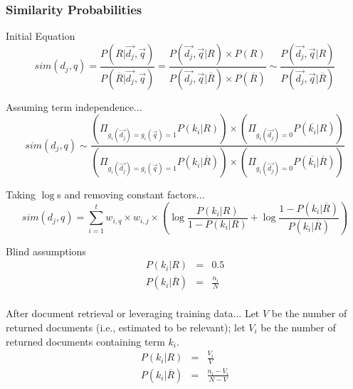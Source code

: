 \documentclass[svgnames]{beamer}
\begin{document}
\begin{frame}[allowframebreaks]
  \frametitle{Similarity Probabilities}

  \begin{block}{Initial Equation}
    \small
    \begin{displaymath}
        sim(d_j,q) = \frac{P(R|\vec{d_j},\vec{q})}{P(\overline{R}|\vec{d_j},\vec{q})}
        = \frac{P(\vec{d_j},\vec{q}|R) \times P(R)}{P(\vec{d_j},\vec{q}|\overline{R}) \times
          P(\overline{R})}
        \sim \frac{P(\vec{d_j},\vec{q}|R)}{P(\vec{d_j},\vec{q}|\overline{R})}
     \end{displaymath}
  \end{block}

  \begin{block}{Assuming term independence...}
    \small
    \begin{displaymath}
      sim(d_j,q) \sim \frac{
        (\Pi_{g_i(\vec{d_j})=g_i(\vec{q})=1}P(k_i|R))\times(\Pi_{g_i(\vec{d_j})=0}P(\overline{k_i}|R))
      }{
        (\Pi_{g_i(\vec{d_j})=g_i(\vec{q})=1}P(k_i|\overline{R}))\times(\Pi_{g_i(\vec{d_j})=0}P(\overline{k_i}|\overline{R}))}
    \end{displaymath}
  \end{block}

  \begin{block}{Taking $\log$s and removing constant factors...}
    \small
    \begin{displaymath}      
      sim(d_j,q) = \sum_{i=1}^t w_{i,q} \times w_{i,j} \times
      \left(
        \log\frac{P(k_i|R)}{1-P(k_i|R)} + \log\frac{1-P(k_i|\overline{R})}{P(k_i|\overline{R})}
      \right)
    \end{displaymath}
  \end{block}

  \begin{block}{Blind assumptions}
    \begin{displaymath}
      \begin{array}{rcl}
        P(k_i|R) &=& 0.5\\
        P(k_i|\overline{R}) &=& \frac{n_i}{N}\\
      \end{array}
    \end{displaymath}
  \end{block}

  \begin{block}{After document retrieval or leveraging training data...}
    Let $V$ be the number of returned documents (i.e., estimated to be relevant); let $V_i$ be the number of
    returned documents containing term $k_i$.
    \begin{displaymath}
      \begin{array}{rcl}
        P(k_i|R) &=& \frac{V_i}{V}\\
        P(k_i|\overline{R}) &=& \frac{n_i - V_i}{N - V}\\
      \end{array}
    \end{displaymath}    
  \end{block}
  

\end{frame}
\end{document}
